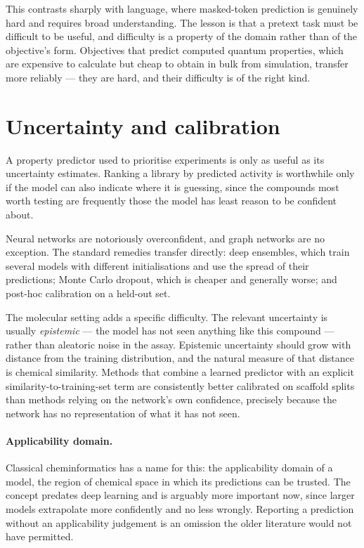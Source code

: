\documentclass[11pt,a4paper]{article}
\begin{document}
This contrasts sharply with language, where masked-token prediction is
genuinely hard and requires broad understanding. The lesson is that a pretext
task must be difficult to be useful, and difficulty is a property of the
domain rather than of the objective's form. Objectives that predict computed
quantum properties, which are expensive to calculate but cheap to obtain in
bulk from simulation, transfer more reliably --- they are hard, and their
difficulty is of the right kind.

\section{Uncertainty and calibration}
\label{sec:uncertainty}

A property predictor used to prioritise experiments is only as useful as its
uncertainty estimates. Ranking a library by predicted activity is worthwhile
only if the model can also indicate where it is guessing, since the compounds
most worth testing are frequently those the model has least reason to be
confident about.

Neural networks are notoriously overconfident, and graph networks are no
exception. The standard remedies transfer directly: deep ensembles, which
train several models with different initialisations and use the spread of
their predictions; Monte Carlo dropout, which is cheaper and generally worse;
and post-hoc calibration on a held-out set.

The molecular setting adds a specific difficulty. The relevant uncertainty is
usually \emph{epistemic} --- the model has not seen anything like this
compound --- rather than aleatoric noise in the assay. Epistemic uncertainty
should grow with distance from the training distribution, and the natural
measure of that distance is chemical similarity. Methods that combine a
learned predictor with an explicit similarity-to-training-set term are
consistently better calibrated on scaffold splits than methods relying on the
network's own confidence, precisely because the network has no representation
of what it has not seen.

\paragraph{Applicability domain.}
Classical cheminformatics has a name for this: the applicability domain of a
model, the region of chemical space in which its predictions can be trusted.
The concept predates deep learning and is arguably more important now, since
larger models extrapolate more confidently and no less wrongly. Reporting a
prediction without an applicability judgement is an omission the older
literature would not have permitted.
\end{document}
